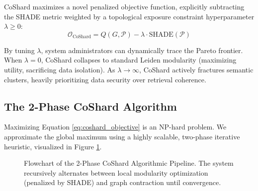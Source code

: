 CoShard maximizes a novel penalized objective function, explicitly subtracting the SHADE metric weighted by a topological exposure constraint hyperparameter $\lambda \geq 0$:
\begin{equation}
\mathcal{O}_{\text{CoShard}} = Q(G, \mathcal{P}) - \lambda \cdot \text{SHADE}(\mathcal{P})
\label{eq:coshard_objective}
\end{equation}

By tuning $\lambda$, system administrators can dynamically trace the Pareto frontier. When $\lambda = 0$, CoShard collapses to standard Leiden modularity (maximizing utility, sacrificing data isolation). As $\lambda \to \infty$, CoShard actively fractures semantic clusters, heavily prioritizing data security over retrieval coherence.

\subsection{The 2-Phase CoShard Algorithm}
Maximizing Equation \ref{eq:coshard_objective} is an NP-hard problem. We approximate the global maximum using a highly scalable, two-phase iterative heuristic, visualized in Figure \ref{fig:coshard_flowchart}.

\begin{figure}[htbp]
\centering
{}
\caption{Flowchart of the 2-Phase CoShard Algorithmic Pipeline. The system recursively alternates between local modularity optimization (penalized by SHADE) and graph contraction until convergence.}
\label{fig:coshard_flowchart}
\end{figure}

